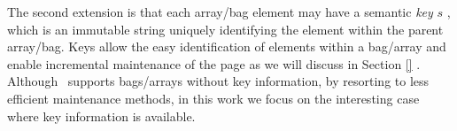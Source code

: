 

The second extension is that each array/bag element may have a semantic \textit{key} \gl{\#(}$s$\gl{)} , which is an immutable string uniquely identifying the element within the parent array/bag. Keys allow the easy identification of elements within a bag/array and enable incremental maintenance of the page as we will discuss in Section \ref{} .  Although \projname\ supports bags/arrays without key information, by resorting to less efficient maintenance methods, in this work we focus on the interesting case where key information is available. 
\\   





